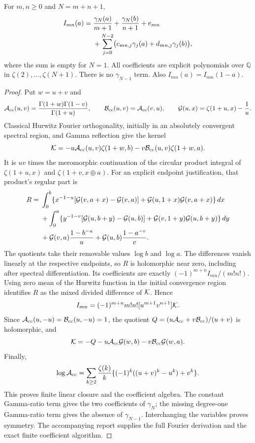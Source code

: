 \begin{theorem}
\label{corrclosure:theorem}
For $m,n\ge0$ and $N=m+n+1$,
\begin{align}
 I_{mn}(a)={}&\frac{\gamma_N(a)}{m+1}
     +\frac{\gamma_N(b)}{n+1}+e_{mn}\notag\\
 &+\sum_{j=0}^{N-2}\bigl(c_{mn,j}\gamma_j(a)
                             +d_{mn,j}\gamma_j(b)\bigr),
 \label{corrclosure:closure}
\end{align}
where the sum is empty for $N=1$. All coefficients are explicit
polynomials over $\mathbb Q$ in $\zeta(2),\ldots,\zeta(N+1)$.
There is no $\gamma_{N-1}$ term. Also $I_{mn}(a)=I_{nm}(1-a)$.
\end{theorem}
\begin{proof}
Put $w=u+v$ and
\[
 \mathcal A_{\mathrm{cc}}(u,v)=\frac{\Gamma(1+w)\Gamma(1-v)}{\Gamma(1+u)},
 \qquad \mathcal B_{\mathrm{cc}}(u,v)=\mathcal A_{\mathrm{cc}}(v,u),\qquad
 \mathcal G(u,x)=\zeta(1+u,x)-\frac1u.
\]
Classical Hurwitz Fourier orthogonality, initially in an absolutely
convergent spectral region, and Gamma reflection give the kernel
\begin{equation}
 \mathcal K=-u\mathcal A_{\mathrm{cc}}(u,v)\zeta(1+w,b)
                    -v\mathcal B_{\mathrm{cc}}(u,v)\zeta(1+w,a).
 \label{corrclosure:kernel}
\end{equation}
It is $uv$ times the meromorphic continuation of the circular product
integral of $\zeta(1+u,x)$ and $\zeta(1+v,x\mathbin\oplus a)$.
For an explicit endpoint justification, that product's regular part is
\begin{align*}
 R={}&\int_0^b\{x^{-1-u}[\mathcal G(v,a+x)-\mathcal G(v,a)]
                   +\mathcal G(u,1+x)\mathcal G(v,a+x)\}\,dx\\
 &+\int_0^a\{y^{-1-v}[\mathcal G(u,b+y)-\mathcal G(u,b)]
                   +\mathcal G(v,1+y)\mathcal G(u,b+y)\}\,dy\\
 &+\mathcal G(v,a)\frac{1-b^{-u}}u
      +\mathcal G(u,b)\frac{1-a^{-v}}v.
\end{align*}
The quotients take their removable values $\log b$ and $\log a$.
The differences vanish linearly at the respective endpoints, so $R$
is holomorphic near zero, including after spectral differentiation.
Its coefficients are exactly $(-1)^{m+n}I_{mn}/(m!n!)$.
Using zero mean of the Hurwitz function in the initial convergence
region identifies $R$ as the mixed divided difference of
$\mathcal K$. Hence
\[
 I_{mn}=(-1)^{m+n}m!n![u^{m+1}v^{n+1}]\mathcal K.
\]
Since $\mathcal A_{\mathrm{cc}}(u,-u)=\mathcal B_{\mathrm{cc}}(u,-u)=1$, the quotient
$Q=(u\mathcal A_{\mathrm{cc}}+v\mathcal B_{\mathrm{cc}})/(u+v)$ is holomorphic, and
\[
 \mathcal K=-Q-u\mathcal A_{\mathrm{cc}}\mathcal G(w,b)
                    -v\mathcal B_{\mathrm{cc}}\mathcal G(w,a).
\]
Finally,
\[
 \log\mathcal A_{\mathrm{cc}}=\sum_{k\ge2}\frac{\zeta(k)}k
       \{(-1)^k((u+v)^k-u^k)+v^k\}.
\]
This proves finite linear closure and the coefficient algebra. The
constant Gamma-ratio term gives the two coefficients of $\gamma_N$;
the missing degree-one Gamma-ratio term gives the absence of
$\gamma_{N-1}$. Interchanging the variables proves symmetry.
The accompanying report supplies the full Fourier derivation and the
exact finite coefficient algorithm.
\end{proof}

